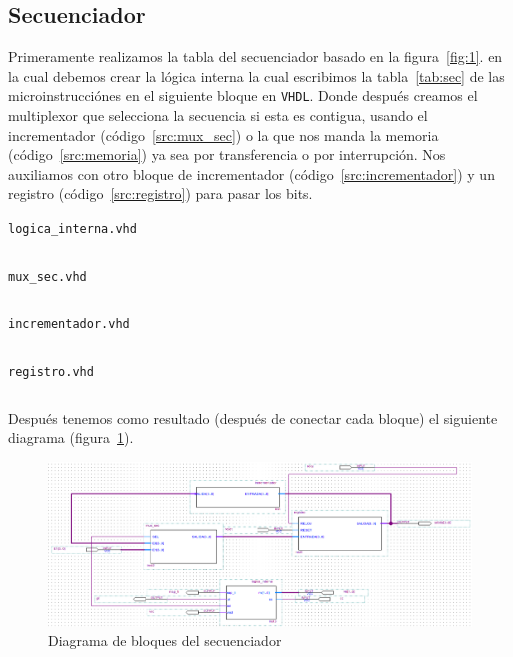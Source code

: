 \documentclass[table]{scrartcl}
\newenvironment{code}{\captionsetup{type=listing}}{}
\begin{document}
\subsection{Secuenciador}\label{sec:secuenciador}
Primeramente realizamos la tabla del secuenciador basado en la
figura~\ref{fig:1}. en la cual debemos crear la lógica interna la cual
escribimos la tabla~\ref{tab:sec} de las microinstrucciónes en el siguiente bloque en
\texttt{VHDL}. Donde después creamos el  multiplexor que selecciona la secuencia
si esta es contigua, usando el incrementador (código~\ref{src:mux_sec}) o la que nos
manda la memoria (código~\ref{src:memoria}) ya sea por transferencia o
por interrupción. Nos auxiliamos con otro bloque de
incrementador (código~\ref{src:incrementador}) y un registro (código~\ref{src:registro}) para pasar los
bits.

\begin{center}
  \scriptsize
  \label{tab:sec}
  
\end{center}

\begin{code}
  \caption{\texttt{logica_interna.vhd}}\label{src:logica_interna}
  \inputminted{vhdl}{./logica_interna.vhd}
\end{code}

\begin{code}
  \caption{\texttt{mux_sec.vhd}}\label{src:mux_sec}
  \inputminted{vhdl}{./mux_sec.vhd}
\end{code}

\begin{code}
  \caption{\texttt{incrementador.vhd}}\label{src:incrementador}
  \inputminted{vhdl}{./incrementador.vhd}
\end{code}

\begin{code}
  \caption{\texttt{registro.vhd}}\label{src:registro}
  \inputminted{vhdl}{./registro.vhd}
\end{code}


Después tenemos como resultado (después de conectar cada bloque) el siguiente
diagrama (figura~\ref{fig:dia_sec}).
\begin{figure}[H]
  \centering
  \includegraphics[width=\textwidth]{./img/dia_sec}
  \caption{Diagrama de bloques del secuenciador}\label{fig:dia_sec}
\end{figure}
\newpage{}
\end{document}
